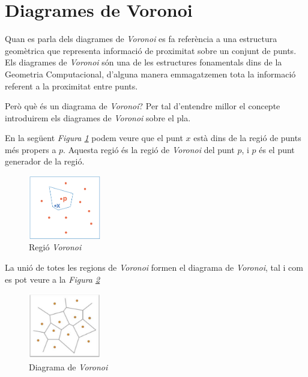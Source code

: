 \documentclass[12pt]{article}
\begin{document}
\clearpage
\appendix
\section{Diagrames de Voronoi \label{ann:dvoronoi}}
Quan es parla dels diagrames de \textit{Voronoi} es fa referència a una estructura geomètrica que representa informació de proximitat sobre un conjunt de punts. Els diagrames de \textit{Voronoi} són una de les estructures fonamentals dins de la Geometria Computacional, d’alguna manera emmagatzemen tota la informació referent a la proximitat entre punts.

Però què és un diagrama de \textit{Voronoi}? Per tal d’entendre millor el concepte introduirem els diagrames de \textit{Voronoi} sobre el pla.

En la següent \textit{Figura \ref{fig:regio_voronoi}} podem veure que el punt $x$ està dins de la regió de punts més propers a $p$. Aquesta regió és la regió de \textit{Voronoi} del punt $p$, i $p$ és el punt generador de la regió.

\begin{figure}[H]
	\centering
	\includegraphics[width=0.28\textwidth]{imatges/regio_voronoi.png}
	\caption{Regió \textit{Voronoi}}
	\label{fig:regio_voronoi}
\end{figure}

La unió de totes les regions de \textit{Voronoi} formen el diagrama de \textit{Voronoi}, tal i com es pot veure a la \textit{Figura \ref{fig:diagrama_voronoi}}

\begin{figure}[H]
	\centering
	\includegraphics[width=0.28\textwidth]{imatges/diagrama_voronoi.png}
	\caption{Diagrama de \textit{Voronoi}}
	\label{fig:diagrama_voronoi}
\end{figure}
\end{document}
